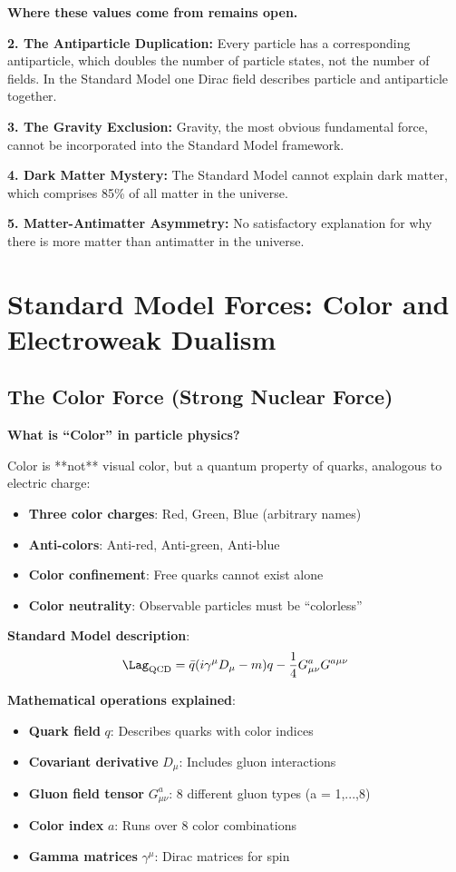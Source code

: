 	\textbf{Where these values come from remains open.}
	
	\textbf{2. The Antiparticle Duplication:}
	Every particle has a corresponding antiparticle, which doubles the number of particle states, not the number of fields. In the Standard Model one Dirac field describes particle and antiparticle together.
	
	\textbf{3. The Gravity Exclusion:}
	Gravity, the most obvious fundamental force, cannot be incorporated into the Standard Model framework.
	
	\textbf{4. Dark Matter Mystery:}
	The Standard Model cannot explain dark matter, which comprises 85\% of all matter in the universe.
	
	\textbf{5. Matter-Antimatter Asymmetry:}
	No satisfactory explanation for why there is more matter than antimatter in the universe.
	
	\section{Standard Model Forces: Color and Electroweak Dualism}
	
	\subsection{The Color Force (Strong Nuclear Force)}
	
	\textbf{What is ``Color'' in particle physics?}
	
	Color is **not** visual color, but a quantum property of quarks, analogous to electric charge:
	
	\begin{itemize}
		\item \textbf{Three color charges}: Red, Green, Blue (arbitrary names)
		\item \textbf{Anti-colors}: Anti-red, Anti-green, Anti-blue
		\item \textbf{Color confinement}: Free quarks cannot exist alone
		\item \textbf{Color neutrality}: Observable particles must be ``colorless''
	\end{itemize}
	
	\textbf{Standard Model description}:
	\begin{equation}
		\Lag_{\text{QCD}} = \bar{q} (i\gamma^\mu D_\mu - m) q - \frac{1}{4} G_{\mu\nu}^a G^{a\mu\nu}
	\end{equation}
	
	\textbf{Mathematical operations explained}:
	\begin{itemize}
		\item \textbf{Quark field} $q$: Describes quarks with color indices
		\item \textbf{Covariant derivative} $D_\mu$: Includes gluon interactions
		\item \textbf{Gluon field tensor} $G_{\mu\nu}^a$: 8 different gluon types (a = 1,...,8)
		\item \textbf{Color index} $a$: Runs over 8 color combinations
		\item \textbf{Gamma matrices} $\gamma^\mu$: Dirac matrices for spin
	\end{itemize}
	

